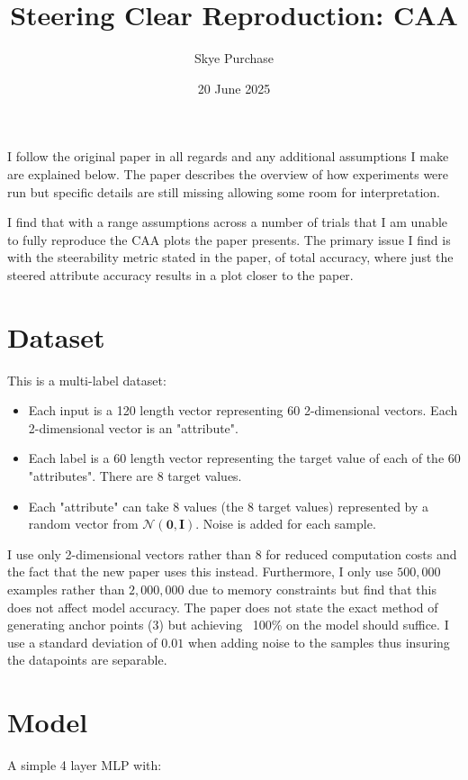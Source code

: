 \documentclass[]{article}
\title{Steering Clear Reproduction: CAA}
\author{Skye Purchase}
\date{20 June 2025}
\begin{document}
\maketitle

I follow the original paper \cite{steering-clear} in all regards and any additional assumptions I make are explained below.
The paper describes the overview of how experiments were run but specific details are still missing allowing some room for interpretation.

I find that with a range assumptions across a number of trials that I am unable to fully reproduce the CAA plots the paper presents.
The primary issue I find is with the steerability metric stated in the paper, of total accuracy, where just the steered attribute accuracy results in a plot closer to the paper.

\section{Dataset}

This is a multi-label dataset:
\begin{itemize}
    \item Each input is a 120 length vector representing 60 2-dimensional vectors. Each 2-dimensional vector is an "attribute".
    \item Each label is a 60 length vector representing the target value of each of the 60 "attributes". There are 8 target values.
    \item Each "attribute" can take 8 values (the 8 target values) represented by a random vector from $\mathcal{N}(\mathbf{0}, \mathbf{I})$. Noise is added for each sample.
\end{itemize}

I use only 2-dimensional vectors rather than 8 for reduced computation costs and the fact that the new paper uses this instead.
Furthermore, I only use $500,000$ examples rather than $2,000,000$ due to memory constraints but find that this does not affect model accuracy.
The paper does not state the exact method of generating anchor points (3) but achieving ~100\% on the model should suffice.
I use a standard deviation of $0.01$ when adding noise to the samples thus insuring the datapoints are separable.

\section{Model}

A simple 4 layer MLP with:
\end{document}
